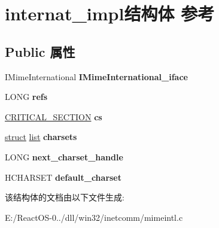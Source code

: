 \hypertarget{structinternat__impl}{}\section{internat\+\_\+impl结构体 参考}
\label{structinternat__impl}
\subsection*{Public 属性}
\begin{DoxyCompactItemize}
\item 
\mbox{\label{structinternat__impl_a83f897c05624019d3bda1e5c43b704ed}} 
I\+Mime\+International {\bfseries I\+Mime\+International\+\_\+iface}
\item 
\mbox{\label{structinternat__impl_a597389ae739c105002290324c777fd9e}} 
L\+O\+NG {\bfseries refs}
\item 
\mbox{\label{structinternat__impl_a165b02e92f517796c19d66c37cb5c0a7}} 
\hyperlink{struct___c_r_i_t_i_c_a_l___s_e_c_t_i_o_n}{C\+R\+I\+T\+I\+C\+A\+L\+\_\+\+S\+E\+C\+T\+I\+ON} {\bfseries cs}
\item 
\mbox{\label{structinternat__impl_a66ed7656bf61fde3d1322caf85818962}} 
\hyperlink{interfacestruct}{struct} \hyperlink{classlist}{list} {\bfseries charsets}
\item 
\mbox{\label{structinternat__impl_ae5bf9669d1138613e292bfa7d6ecc5d5}} 
L\+O\+NG {\bfseries next\+\_\+charset\+\_\+handle}
\item 
\mbox{\label{structinternat__impl_a9e22511c4e86fa7b69b6dcc49b9b681d}} 
H\+C\+H\+A\+R\+S\+ET {\bfseries default\+\_\+charset}
\end{DoxyCompactItemize}


该结构体的文档由以下文件生成\+:\begin{DoxyCompactItemize}
\item 
E\+:/\+React\+O\+S-\/0../dll/win32/inetcomm/mimeintl.\+c\end{DoxyCompactItemize}
